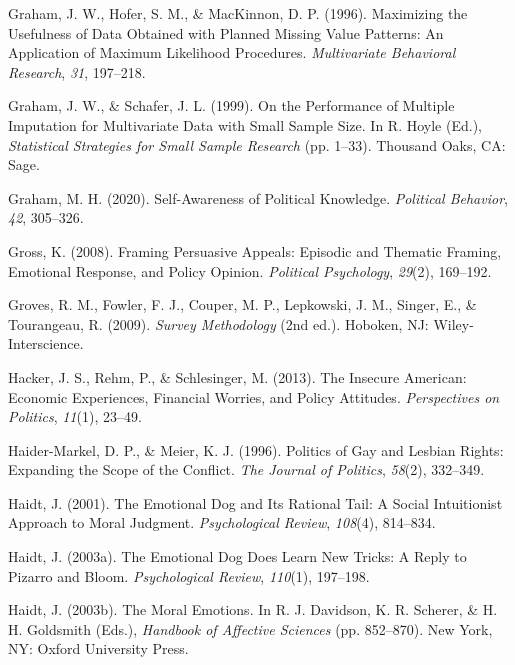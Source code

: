 \documentclass[12pt,econ]{sources/authesis}
\begin{document}
\leavevmode\hypertarget{ref-graham_1996_maximizing}{}%
Graham, J. W., Hofer, S. M., \& MacKinnon, D. P. (1996). Maximizing the Usefulness of Data Obtained with Planned Missing Value Patterns: An Application of Maximum Likelihood Procedures. \emph{Multivariate Behavioral Research}, \emph{31}, 197--218.

\leavevmode\hypertarget{ref-graham_1999_performance}{}%
Graham, J. W., \& Schafer, J. L. (1999). On the Performance of Multiple Imputation for Multivariate Data with Small Sample Size. In R. Hoyle (Ed.), \emph{Statistical Strategies for Small Sample Research} (pp. 1--33). Thousand Oaks, CA: Sage.

\leavevmode\hypertarget{ref-graham_2020_self-awareness}{}%
Graham, M. H. (2020). Self-Awareness of Political Knowledge. \emph{Political Behavior}, \emph{42}, 305--326.

\leavevmode\hypertarget{ref-gross_framing_2008}{}%
Gross, K. (2008). Framing Persuasive Appeals: Episodic and Thematic Framing, Emotional Response, and Policy Opinion. \emph{Political Psychology}, \emph{29}(2), 169--192.

\leavevmode\hypertarget{ref-groves_survey_2009}{}%
Groves, R. M., Fowler, F. J., Couper, M. P., Lepkowski, J. M., Singer, E., \& Tourangeau, R. (2009). \emph{Survey Methodology} (2nd ed.). Hoboken, NJ: Wiley-Interscience.

\leavevmode\hypertarget{ref-hacker_insecure_2013}{}%
Hacker, J. S., Rehm, P., \& Schlesinger, M. (2013). The Insecure American: Economic Experiences, Financial Worries, and Policy Attitudes. \emph{Perspectives on Politics}, \emph{11}(1), 23--49.

\leavevmode\hypertarget{ref-haider-markel_1996_politics}{}%
Haider-Markel, D. P., \& Meier, K. J. (1996). Politics of Gay and Lesbian Rights: Expanding the Scope of the Conflict. \emph{The Journal of Politics}, \emph{58}(2), 332--349.

\leavevmode\hypertarget{ref-haidt_2001_emotional}{}%
Haidt, J. (2001). The Emotional Dog and Its Rational Tail: A Social Intuitionist Approach to Moral Judgment. \emph{Psychological Review}, \emph{108}(4), 814--834.

\leavevmode\hypertarget{ref-haidt_2003_emotional}{}%
Haidt, J. (2003a). The Emotional Dog Does Learn New Tricks: A Reply to Pizarro and Bloom. \emph{Psychological Review}, \emph{110}(1), 197--198.

\leavevmode\hypertarget{ref-haidt_moral_2003}{}%
Haidt, J. (2003b). The Moral Emotions. In R. J. Davidson, K. R. Scherer, \& H. H. Goldsmith (Eds.), \emph{Handbook of Affective Sciences} (pp. 852--870). New York, NY: Oxford University Press.
\end{document}
